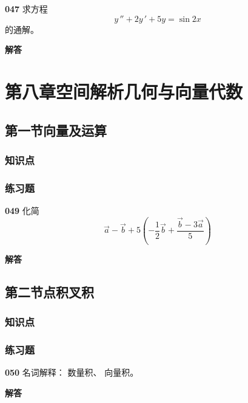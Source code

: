 \documentclass[a4paper,10pt]{article} %
\begin{document}


\textheight


\par\noindent \textbf{047} \quad 求方程
$$y\,''+2y\,'+5y=\sin 2x$$
的通解。
\par\noindent \textbf{ 解答}





\textheight


\newpage
\section{第八章\quad 空间解析几何与向量代数}
\subsection{第一节\quad 向量及运算}
\subsubsection{知识点}
\subsubsection{练习题}
\par\noindent \textbf{049} \quad 化简
$$\vec{a}-\vec{b}+5\left(-\frac{1}{2}\vec{b}+\frac{\vec{b}-3\vec{a}}{5}\right)$$
\par\noindent \textbf{ 解答}





\textheight


\newpage
\subsection{第二节\quad 点积叉积}
\subsubsection{知识点}
\subsubsection{练习题}
\par\noindent \textbf{050} \quad 名词解释： 数量积、 向量积。
\par\noindent \textbf{ 解答}
\end{document}
